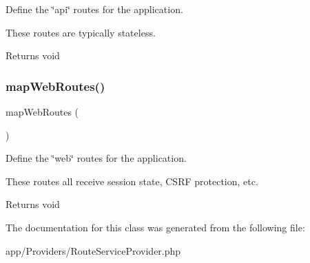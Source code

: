 Define the \char`\"{}api\char`\"{} routes for the application.

These routes are typically stateless.

\begin{DoxyReturn}{Returns}
void 
\end{DoxyReturn}
\mbox{\label{class_app_1_1_providers_1_1_route_service_provider_ac887962db9a9a8f344572bd205a02165}} 
\subsubsection{\texorpdfstring{mapWebRoutes()}{mapWebRoutes()}}
{\footnotesize\ttfamily map\+Web\+Routes (\begin{DoxyParamCaption}{ }\end{DoxyParamCaption})\hspace{0.3cm}{\ttfamily [protected]}}

Define the \char`\"{}web\char`\"{} routes for the application.

These routes all receive session state, C\+S\+RF protection, etc.

\begin{DoxyReturn}{Returns}
void 
\end{DoxyReturn}


The documentation for this class was generated from the following file\+:\begin{DoxyCompactItemize}
\item 
app/\+Providers/Route\+Service\+Provider.\+php\end{DoxyCompactItemize}
